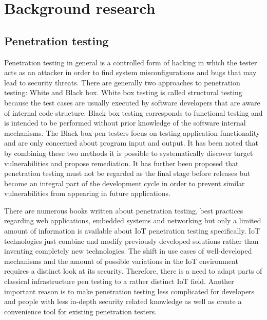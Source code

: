 \section{Background research}

\subsection{Penetration testing}
Penetration testing in general is a controlled form of hacking in which the tester acts as an attacker in order to find system misconfigurations and bugs that may lead to security threats\cite{usd}. There are generally two approaches to penetration testing: White and Black box. White box testing is called structural testing because the test cases are usually executed by software developers that are aware of internal code structure. Black box testing corresponds to functional testing and is intended to be performed without prior knowledge of the software internal mechanisms. The Black box pen testers focus on testing application functionality and are only concerned about program input and output\cite{nidhra}. It has been noted that by combining these two methods it is possible to systematically discover target vulnerabilities and propose remediation\cite{7452095}. It has further been proposed that penetration testing must not be regarded as the final stage before releases but become an integral part of the development cycle in order to prevent similar vulnerabilities from appearing in future applications\cite{1392709}. 

There are numerous books written about penetration testing\cite{pentestbook}, best practices regarding web applications, embedded systems and networking but only a limited amount of information is available about IoT penetration testing specifically\cite{cookbook}. IoT technologies just combine and modify previously developed solutions rather than inventing completely new technologies. The shift in use cases of well-developed mechanisms and the amount of possible variations in the IoT environment requires a distinct look at its security. Therefore, there is a need to adapt parts of classical infrastructure pen testing to a rather distinct IoT field. Another important reason is to make penetration testing less complicated for developers and people with less in-depth security related knowledge as well as create a convenience tool for existing penetration testers.

